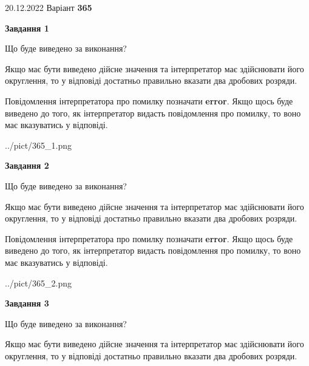 \documentclass[12pt, ukrainian]{article}
\begin{document}
{20.12.2022 Варіант \No \textbf { 365 }\par}
{
\begin {Large}

{\begin {center}\textbf{Завдання 1}\end {center}}\par
Що буде виведено за виконання? \par

Якщо має бути виведено дійсне значення та інтерпретатор має здійснювати його округлення, 
то у відповіді достатньо правильно вказати два дробових розряди.

Повідомлення інтерпретатора про помилку позначати \textbf{error}.
Якщо щось буде виведено до того, як інтерпретатор видасть повідомлення про помилку, 
то воно має вказуватись у відповіді. \par

\begin{center}
	{../pict/365_1.png}
\end{center}
\newpage

{\begin {center}\textbf{Завдання 2}\end {center}}\par
Що буде виведено за виконання? \par

Якщо має бути виведено дійсне значення та інтерпретатор має здійснювати його округлення, 
то у відповіді достатньо правильно вказати два дробових розряди.

Повідомлення інтерпретатора про помилку позначати \textbf{error}.
Якщо щось буде виведено до того, як інтерпретатор видасть повідомлення про помилку, 
то воно має вказуватись у відповіді. \par

\begin{center}
	{../pict/365_2.png}
\end{center}
\newpage

{\begin {center}\textbf{Завдання 3}\end {center}}\par
Що буде виведено за виконання? \par

Якщо має бути виведено дійсне значення та інтерпретатор має здійснювати його округлення, 
то у відповіді достатньо правильно вказати два дробових розряди.


\end{Large}}
\end{document}
